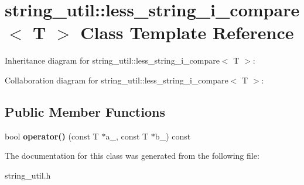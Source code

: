 \section{string\+\_\+util\+:\+:less\+\_\+string\+\_\+i\+\_\+compare$<$ T $>$ Class Template Reference}
\label{classstring__util_1_1less__string__i__compare}


Inheritance diagram for string\+\_\+util\+:\+:less\+\_\+string\+\_\+i\+\_\+compare$<$ T $>$\+:


Collaboration diagram for string\+\_\+util\+:\+:less\+\_\+string\+\_\+i\+\_\+compare$<$ T $>$\+:
\subsection*{Public Member Functions}
\begin{DoxyCompactItemize}
\item 
bool {\bfseries operator()} (const T $\ast$a\+\_\+, const T $\ast$b\+\_\+) const \label{classstring__util_1_1less__string__i__compare_ae2dd6a625b07bc51060805b30e7547a1}

\end{DoxyCompactItemize}


The documentation for this class was generated from the following file\+:\begin{DoxyCompactItemize}
\item 
string\+\_\+util.\+h\end{DoxyCompactItemize}

